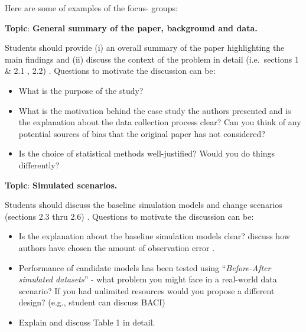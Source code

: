 \documentclass[
  letterpaper,
  DIV=11,
  numbers=noendperiod]{scrartcl}
\providecommand{\tightlist}{%
  \setlength{\itemsep}{0pt}\setlength{\parskip}{0pt}}\usepackage{longtable,booktabs,array}
\begin{document}
Here are some of examples of the focus- groups:

\begin{tcolorbox}[enhanced jigsaw, colbacktitle=quarto-callout-tip-color!10!white, colframe=quarto-callout-tip-color-frame, left=2mm, rightrule=.15mm, breakable, bottomrule=.15mm, toptitle=1mm, arc=.35mm, toprule=.15mm, coltitle=black, colback=white, opacityback=0, bottomtitle=1mm, titlerule=0mm, title={Example: Group 1}, opacitybacktitle=0.6, leftrule=.75mm]

\textbf{Topic}: \textbf{General summary of the paper, background and
data.}

Students should provide (i) an overall summary of the paper highlighting
the main findings and (ii) discuss the context of the problem in detail
(i.e.~sections 1 \& 2.1 , 2.2) . Questions to motivate the discussion
can be:

\begin{itemize}
\tightlist
\item
  What is the purpose of the study?
\item
  What is the motivation behind the case study the authors presented and
  is the explanation about the data collection process clear? Can you
  think of any potential sources of bias that the original paper has not
  considered?
\item
  Is the choice of statistical methods well-justified? Would you do
  things differently?
\end{itemize}

\end{tcolorbox}

\begin{tcolorbox}[enhanced jigsaw, colbacktitle=quarto-callout-tip-color!10!white, colframe=quarto-callout-tip-color-frame, left=2mm, rightrule=.15mm, breakable, bottomrule=.15mm, toptitle=1mm, arc=.35mm, toprule=.15mm, coltitle=black, colback=white, opacityback=0, bottomtitle=1mm, titlerule=0mm, title={Example: Group 2}, opacitybacktitle=0.6, leftrule=.75mm]

\textbf{Topic}: \textbf{Simulated scenarios.}

Students should discuss the baseline simulation models and change
scenarios (sections 2.3 thru 2.6) . Questions to motivate the discussion
can be:

\begin{itemize}
\tightlist
\item
  Is the explanation about the baseline simulation models clear? discuss
  how authors have chosen the amount of observation error .
\item
  Performance of candidate models has been tested using
  ``\emph{Before-After simulated datasets}'' - what problem you might
  face in a real-world data scenario? If you had unlimited resources
  would you propose a different design? (e.g., student can discuss BACI)
\item
  Explain and discuss Table 1 in detail.
\end{itemize}

\end{tcolorbox}
\end{document}

